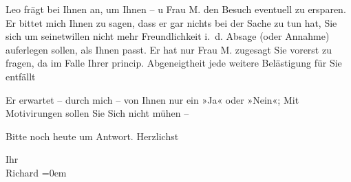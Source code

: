                   Leo frägt bei Ihnen an, um Ihnen – u Frau
                  M. den Besuch \introOben{}eventuell\introOben{} zu ersparen. Er bittet mich Ihnen zu sagen, dass er gar nichts
               bei der Sache zu tun hat, Sie sich um seinetwillen nicht mehr {\pb}Freundlichkeit i. d. Absage (oder
               Annahme) auferlegen sollen, als  Ihnen passt. Er
               hat nur Frau M. zugesagt Sie vorerst zu
               fragen, da im Falle Ihrer princip. Abgeneigtheit jede weitere Belästigung für Sie
               entfällt\pend
           
\pstart
           Er erwartet – durch mich – von Ihnen nur ein »Ja« oder »Nein«; \introOben{}Mit\introOben{} Motivirungen sollen Sie Sich nicht mühen –\pend
           
\pstart
           Bitte noch heute um Antwort. Herzlichst\pend
           
\pstart
           Ihr{\\[\baselineskip]}\spacefill\mbox{Richard}\pend
           \leftskip=0em{}\endnumbering{}  \newcommand{\dateiname}{L01976}\newcommand{\titel}{Richard Beer-Hofmann an Arthur Schnitzler, 3. 11. 1910}\newcommand{\editorInnen}{Martin Anton Müller und Gerd-Hermann Susen}
